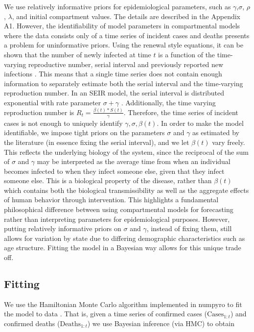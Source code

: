 \documentclass{umassthesis}          %
\begin{document}
We use relatively informative priors for epidemiological parameters, such as $\gamma$,$\sigma$, $\rho$,  $\lambda$, and initial compartment values. The details are described in the Appendix A1. However, the identifiability of model parameters in compartmental models where the data consists only of a time series of incident cases and deaths presents a problem for uninformative priors. Using the renewal style equations, it can be shown that the number of newly infected at time $t$ is a function of the time-varying reproductive number, serial interval and previously reported new infections \cite{wallinga2007generation}. This means that a single time series does not contain enough information to separately estimate both the serial interval and the time-varying reproduction number. In an SEIR model, the serial interval is distributed exponential with rate parameter $\sigma + \gamma$ \cite{wallinga2007generation}. Additionally, the time varying reproduction number is $R_t = \frac{\beta(t)*S(t)}{\gamma}$. Therefore, the time series of incident cases is not enough to uniquely identify $\gamma,\sigma,\beta(t)$. In order to make the model identifiable, we impose tight priors on the parameters $\sigma$ and $\gamma$ as estimated by the literature (in essence fixing the serial interval), and we let $\beta(t)$ vary freely. This reflects the underlying biology of the system, since the reciprocal of the sum of $\sigma$ and $\gamma$ may be interpreted as the average time from when an individual becomes infected to when they infect someone else, given that they infect someone else. This is a biological property of the disease, rather than $\beta(t)$ which contains both the biological transmissibility as well as the aggregate effects of human behavior through intervention. This highlights a fundamental philosophical difference between using compartmental models for forecasting rather than interpreting parameters for epidemiological purposes. However, putting relatively informative priors on $\sigma$ and $\gamma$, instead of fixing them, still allows for variation by state due to differing demographic characteristics such as age structure. Fitting the model in a Bayesian way allows for this unique trade off.  

  \subsection{Fitting}
We use the Hamiltonian Monte Carlo algorithm implemented in numpyro to fit the model to data \cite{numpyro}. That is, given a time series of confirmed cases ($\text{Cases}_{1:t}$) and confirmed deaths ($\text{Deaths}_{1:t}$) we use Bayesian inference (via HMC) to obtain 
\end{document}

